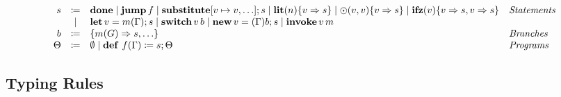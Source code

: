 
\begin{definition}
    \[ 
      \begin{array}{r c l l}
        s & \coloneqq & \mathbf{done}  \mid \mathbf{jump}\, f \mid \mathbf{substitute}[v \mapsto v,\ldots];s \mid \mathbf{lit}(n)\{ v \Rightarrow s \} \mid \odot(v, v)\{ v \Rightarrow s \} \mid \mathbf{ifz}(v)\{ v \Rightarrow s, v \Rightarrow s \} & \emph{Statements}\\
        & \mid & \mathbf{let}\, v = m(\Gamma); s \mid \mathbf{switch}\, v\, b \mid \mathbf{new}\, v = (\Gamma)b; s \mid \mathbf{invoke}\, v\, m & \\
        b & \coloneqq & \{ m(G) \Rightarrow s, \ldots \} & \emph{Branches}\\
        \Theta & \coloneqq & \emptyset \mid \mathbf{def}\ f(\Gamma) \coloneq s; \Theta & \emph{Programs}\\
      \end{array}
    \]
\end{definition}

\subsection{Typing Rules}
\label{subsec:axcut:typing-rules}

